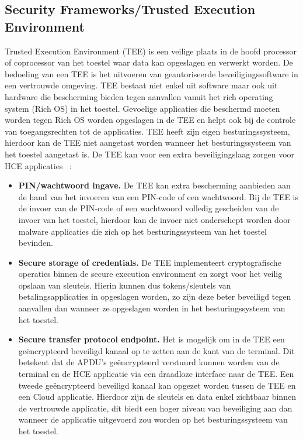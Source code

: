 \subsection{Security Frameworks/Trusted Execution Environment}
\label{subsec:TEE}
Trusted Execution Environment (TEE) is een veilige plaats in de hoofd processor of coprocessor van het toestel waar data kan opgeslagen en verwerkt worden. De bedoeling van een TEE is het uitvoeren van geautoriseerde beveiligingssoftware in een vertrouwde omgeving. TEE bestaat niet enkel uit software maar ook uit hardware die bescherming bieden tegen aanvallen vanuit het rich operating system (Rich OS) in het toestel. Gevoelige applicaties die beschermd moeten worden tegen Rich OS worden opgeslagen in de TEE en helpt ook bij de controle van toegangsrechten tot de applicaties. TEE heeft zijn eigen besturingssysteem, hierdoor kan de TEE niet aangetast worden wanneer het besturingssysteem van het toestel aangetast is. De TEE kan voor een extra beveiligingslaag zorgen voor HCE applicaties ~\autocite{SCA2014}:

\begin{itemize}
	\item \textbf{PIN/wachtwoord ingave.} De TEE kan extra bescherming aanbieden aan de hand van het invoeren van een PIN-code of een wachtwoord. Bij de TEE is de invoer van de PIN-code of een wachtwoord volledig gescheiden van de invoer van het toestel, hierdoor kan de invoer niet onderschept worden door malware applicaties die zich op het besturingssysteem van het toestel bevinden.
	
	\item \textbf{Secure storage of credentials.} De TEE implementeert cryptografische operaties binnen de secure execution environment en zorgt voor het veilig opslaan van sleutels. Hierin kunnen dus tokens/sleutels van betalingsapplicaties in opgeslagen worden, zo zijn deze beter beveiligd tegen aanvallen dan wanneer ze opgeslagen worden in het besturingssysteem van het toestel.
	  
	\item \textbf{Secure transfer protocol endpoint.} Het is mogelijk om in de TEE een geëncrypteerd beveiligd kanaal op te zetten aan de kant van de terminal. Dit betekent dat de APDU's geëncrypteerd verstuurd kunnen worden van de terminal en de HCE applicatie via een draadloze interface naar de TEE. Een tweede geëncrypteerd beveiligd kanaal kan opgezet worden tussen de TEE en een Cloud applicatie. Hierdoor zijn de sleutels en data enkel zichtbaar binnen de vertrouwde applicatie, dit biedt een hoger niveau van beveiliging aan dan wanneer de applicatie uitgevoerd zou worden op het besturingssysteem van het toestel.
\end{itemize}

